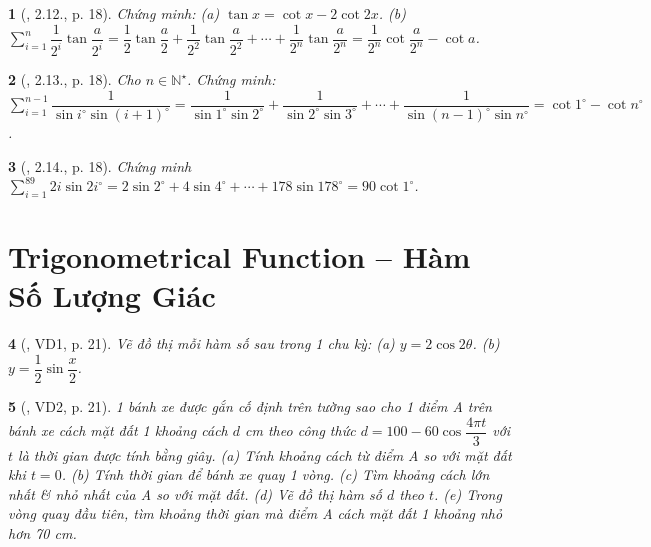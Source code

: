 \documentclass{article}
\newtheorem{baitoan}{}
\begin{document}
\begin{baitoan}[\cite{Hung_nang_cao_phat_trien_Toan_11_tap_1}, 2.12., p. 18]
	Chứng minh: (a) $\tan x = \cot x - 2\cot2x$. (b) $\sum_{i=1}^n \dfrac{1}{2^i}\tan\dfrac{a}{2^i} = \dfrac{1}{2}\tan\dfrac{a}{2} + \dfrac{1}{2^2}\tan\dfrac{a}{2^2} + \cdots + \dfrac{1}{2^n}\tan\dfrac{a}{2^n} = \dfrac{1}{2^n}\cot\dfrac{a}{2^n} - \cot a$.
\end{baitoan}

\begin{baitoan}[\cite{Hung_nang_cao_phat_trien_Toan_11_tap_1}, 2.13., p. 18]
	Cho $n\in\mathbb{N}^\star$. Chứng minh: $\sum_{i=1}^{n-1} \dfrac{1}{\sin i^\circ\sin(i + 1)^\circ} = \dfrac{1}{\sin1^\circ\sin2^\circ} + \dfrac{1}{\sin2^\circ\sin3^\circ} + \cdots + \dfrac{1}{\sin(n - 1)^\circ\sin n^\circ} = \cot1^\circ - \cot n^\circ$.
\end{baitoan}

\begin{baitoan}[\cite{Hung_nang_cao_phat_trien_Toan_11_tap_1}, 2.14., p. 18]
	Chứng minh $\sum_{i=1}^{89} 2i\sin2i^\circ = 2\sin2^\circ + 4\sin4^\circ + \cdots + 178\sin178^\circ = 90\cot1^\circ$.
\end{baitoan}


\section{Trigonometrical Function -- Hàm Số Lượng Giác}

\begin{baitoan}[\cite{Hung_nang_cao_phat_trien_Toan_11_tap_1}, VD1, p. 21]
	Vẽ đồ thị mỗi hàm số sau trong 1 chu kỳ: (a) $y = 2\cos2\theta$. (b) $y = \dfrac{1}{2}\sin\dfrac{x}{2}$.
\end{baitoan}

\begin{baitoan}[\cite{Hung_nang_cao_phat_trien_Toan_11_tap_1}, VD2, p. 21]
	1 bánh xe được gắn cố định trên tường sao cho 1 điểm A trên bánh xe cách mặt đất 1 khoảng cách $d$ {\rm cm} theo công thức $d = 100 - 60\cos\dfrac{4\pi t}{3}$ với $t$ là thời gian được tính bằng giây. (a) Tính khoảng cách từ điểm A so với mặt đất khi $t = 0$. (b) Tính thời gian để bánh xe quay 1 vòng. (c) Tìm khoảng cách lớn nhất \& nhỏ nhất của A so với mặt đất. (d) Vẽ đồ thị hàm số $d$ theo $t$. (e) Trong vòng quay đầu tiên, tìm khoảng thời gian mà điểm A cách mặt đất 1 khoảng nhỏ hơn {\rm70 cm}.
\end{baitoan}
\end{document}
